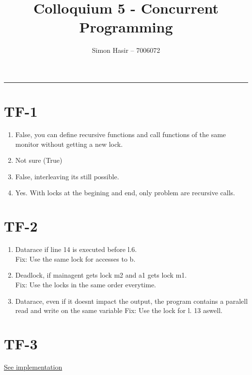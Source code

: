 \documentclass[12pt]{article}
\title{Colloquium 5 - Concurrent Programming}
\author{Simon Hasir -- 7006072}
\begin{document}
    \maketitle
    \noindent
    \rule{\linewidth}{0.4pt}
    
    \section{TF-1}
    \begin{enumerate}[label=(\alph*)]
        \item False, you can define recursive functions and call functions of the same monitor
        without getting a new lock.
        \item Not sure (True)
        \item False, interleaving its still possible.
        \item Yes. With locks at the begining and end, only problem are recursive calls.
    \end{enumerate}
    \section{TF-2}
    \begin{enumerate}[label=(\alph*)]
        \item Datarace if line 14 is executed before l.6.\\
        Fix: Use the same lock for accesses to b.
        \item Deadlock, if mainagent gets lock m2 and a1 gets lock m1. \\
        Fix: Use the locks in the same order everytime.
        \item Datarace, even if it doesnt impact the output, the program contains a paralell read and write on the same variable
        Fix: Use the lock for l. 13 aswell.
    \end{enumerate}
    \section{TF-3}
    \href{https://pseuco.com/#/edit/remote/qsdwbcrf6c970rdrtnmq}{See implementation}
    
\end{document}
